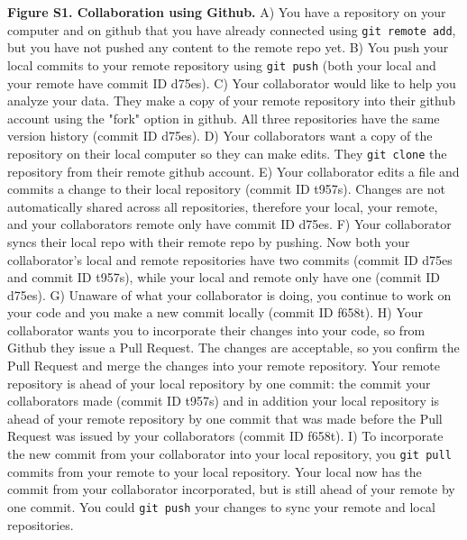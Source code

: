 \textbf{Figure S1. Collaboration using Github.} A) You have a repository on your computer and on github that you have already connected using \verb|git remote add|, but you have not pushed any content to the remote repo yet. B) You push your local commits to your remote repository using \verb|git push| (both your local and your remote have commit ID d75es). C) Your collaborator would like to help you analyze your data. They make a copy of your remote repository into their github account using the "fork" option in github. All three repositories have the same version history (commit ID d75es). D) Your collaborators want a copy of the repository on their local computer so they can make edits. They \verb|git clone| the repository from their remote github account. E) Your collaborator edits a file and commits a change to their local repository (commit ID t957s). Changes are not automatically shared across all repositories, therefore your local, your remote, and your collaborators remote only have commit ID d75es. F) Your collaborator syncs their local repo with their remote repo by pushing. Now both your collaborator's local and remote repositories have two commits (commit ID d75es and commit ID t957s), while your local and remote only have one (commit ID d75es). G) Unaware of what your collaborator is doing, you continue to work on your code and you make a new commit locally (commit ID f658t). H) Your collaborator wants you to incorporate their changes into your code, so from Github they issue a Pull Request. The changes are acceptable, so you confirm the Pull Request and merge the changes into your remote repository. Your remote repository is ahead of your local repository by one commit: the commit your collaborators made (commit ID t957s) and in addition your local repository is ahead of your remote repository by one commit that was made before the Pull Request was issued by your collaborators (commit ID f658t). I) To incorporate the new commit from your collaborator into your local repository, you \verb|git pull| commits from your remote to your local repository. Your local now has the commit from your collaborator incorporated, but is still ahead of your remote by one commit. You could \verb|git push| your changes to sync your remote and local repositories. 